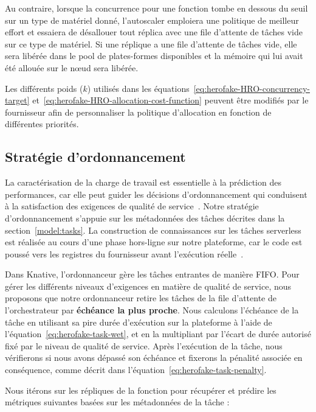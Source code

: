 Au contraire, lorsque la concurrence pour une fonction tombe en dessous du seuil sur un type de matériel donné, l'autoscaler emploiera une politique de meilleur effort et essaiera de désallouer tout réplica avec une file d'attente de tâches vide sur ce type de matériel. Si une réplique a une file d'attente de tâches vide, elle sera libérée dans le pool de plates-formes disponibles et la mémoire qui lui avait été allouée sur le nœud sera libérée.

Les différents poids ($k$) utilisés dans les équations~\ref{eq:herofake-HRO-concurrency-target} et~\ref{eq:herofake-HRO-allocation-cost-function} peuvent être modifiés par le fournisseur afin de personnaliser la politique d'allocation en fonction de différentes priorités.

\subsection{Stratégie d'ordonnancement} \label{section:herofake-scheduling-strategy}

La caractérisation de la charge de travail est essentielle à la prédiction des performances, car elle peut guider les décisions d'ordonnancement qui conduisent à la satisfaction des exigences de qualité de service~\cite{mampageHolisticViewResource2022}. Notre stratégie d'ordonnancement s'appuie sur les métadonnées des tâches décrites dans la section~\ref{model:tasks}. La construction de connaissances sur les tâches serverless est réalisée au cours d'une phase hors-ligne sur notre plateforme, car le code est poussé vers les registres du fournisseur avant l'exécution réelle~\cite{shahradServerlessWildCharacterizing}.

Dans Knative, l'ordonnanceur gère les tâches entrantes de manière FIFO. Pour gérer les différents niveaux d'exigences en matière de qualité de service, nous proposons que notre ordonnanceur retire les tâches de la file d'attente de l'orchestrateur par \textbf{échéance la plus proche}. Nous calculons l'échéance de la tâche en utilisant sa pire durée d'exécution sur la plateforme à l'aide de l'équation~\ref{eq:herofake-task-wet}, et en la multipliant par l'écart de durée autorisé fixé par le niveau de qualité de service. Après l'exécution de la tâche, nous vérifierons si nous avons dépassé son échéance et fixerons la pénalité associée en conséquence, comme décrit dans l'équation~\ref{eq:herofake-task-penalty}. 

Nous itérons sur les répliques de la fonction pour récupérer et prédire les métriques suivantes basées sur les métadonnées de la tâche :

